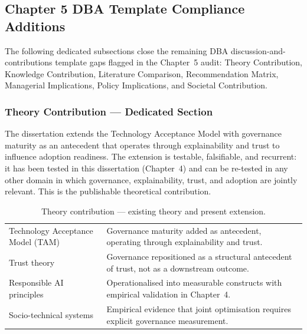 \subsection{Chapter 5 DBA Template Compliance Additions}
\label{sec:ch5_template_compliance}

\noindent The following dedicated subsections close the remaining DBA discussion-and-contributions template gaps flagged in the Chapter~5 audit: Theory Contribution, Knowledge Contribution, Literature Comparison, Recommendation Matrix, Managerial Implications, Policy Implications, and Societal Contribution.

\subsubsection{Theory Contribution --- Dedicated Section}
\label{sec:ch5_theory_contribution_dedicated}

\noindent The dissertation extends the Technology Acceptance Model with governance maturity as an antecedent that operates through explainability and trust to influence adoption readiness. The extension is testable, falsifiable, and recurrent: it has been tested in this dissertation (Chapter~4) and can be re-tested in any other domain in which governance, explainability, trust, and adoption are jointly relevant. This is the publishable theoretical contribution.

{\tablestripes\tablefontsize
{}
\begin{xltabular}{\textwidth}{@{} >{\raggedright\arraybackslash}p{5cm} L @{}}
\caption[Theory contribution --- existing theory and present extension]{Theory contribution --- existing theory and present extension.}\label{tab:ch5_theory_contribution_dedicated} \\
\toprule
{} &  \\
\midrule
\endfirsthead
\endhead
\bottomrule
\endlastfoot
Technology Acceptance Model (TAM) & Governance maturity added as antecedent, operating through explainability and trust. \\
\addlinespace
Trust theory & Governance repositioned as a structural antecedent of trust, not as a downstream outcome. \\
\addlinespace
Responsible AI principles & Operationalised into measurable constructs with empirical validation in Chapter~4. \\
\addlinespace
Socio-technical systems & Empirical evidence that joint optimisation requires explicit governance measurement. \\
\end{xltabular}}

